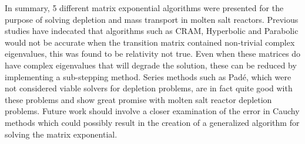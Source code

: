In summary, 5 different matrix exponential algorithms were presented for the purpose of solving depletion and mass transport in molten salt reactors. Previous studies have indecated that algorithms such as CRAM, Hyperbolic and Parabolic would not be accurate when the transition matrix contained non-trivial complex eigenvalues, this was found to be relativity not true. Even when these matrices do have complex eigenvalues that will degrade the solution, these can be reduced by implementing a sub-stepping method. Series methods such as Pad\'e, which were not considered viable solvers for depletion problems, are in fact quite good with these problems and show great promise with molten salt reactor depletion problems. Future work should involve a closer examination of the error in Cauchy methods which could possibly result in the creation of a generalized algorithm for solving the matrix exponential. 

